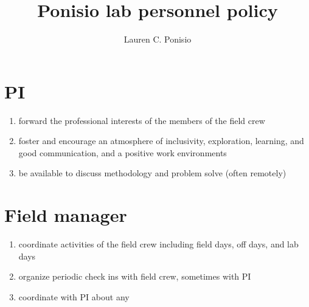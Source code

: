 \documentclass[12pt]{article}
\title{Ponisio lab personnel policy}
\author{Lauren C. Ponisio}
\begin{document}
\maketitle

\section{PI}
\begin{enumerate} 
\item forward the professional interests of the members of the field
  crew
\item foster and encourage an atmosphere of inclusivity, exploration,
  learning, and good communication, and a positive work environments
\item be available to discuss methodology and problem solve (often
  remotely)
\end{enumerate}



\section{Field manager}
\begin{enumerate}
\item coordinate activities of the field crew including field days,
  off days, and lab days
\item organize periodic check ins with field crew, sometimes with PI
\item coordinate with PI about any 
\end{enumerate}
\end{document}
